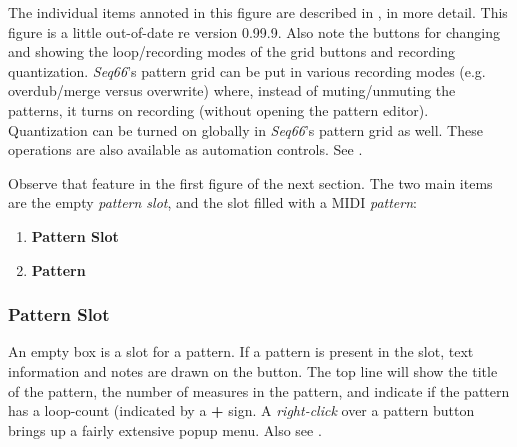    The individual items annoted in this figure are described in
   , in more detail.
   This figure is a little out-of-date re version 0.99.9.
   Also note the buttons for changing and showing the
   loop/recording modes of the grid buttons and recording quantization.
   \textsl{Seq66}'s pattern grid can be put in various recording
   modes (e.g. overdub/merge versus overwrite) where, instead of
   muting/unmuting the patterns, it turns on recording (without opening the
   pattern editor).
   Quantization can be turned on globally in \textsl{Seq66}'s pattern grid
   as well.
   These operations are also available as automation controls.
   See .

   Observe that feature in the first figure of the next section.
   The two main items are the empty \textsl{pattern slot}, and the slot filled
   with a MIDI \textsl{pattern}:

   \begin{enumerate}
      \item \textbf{Pattern Slot}
      \item \textbf{Pattern}
   \end{enumerate}

\subsubsection{Pattern Slot}
\label{subsubsec:patterns_pattern_slot}

   An empty box is a slot for a pattern.
   If a pattern is present in the slot, text information and notes are drawn on
   the button.
   The top line will show
   the title of the pattern, the number of measures in the pattern, and
   indicate if the pattern has a loop-count (indicated by a
   \textbf{+} sign.
   A \textsl{right-click} over a pattern button brings up a fairly extensive
   popup menu.
   Also see .

%

